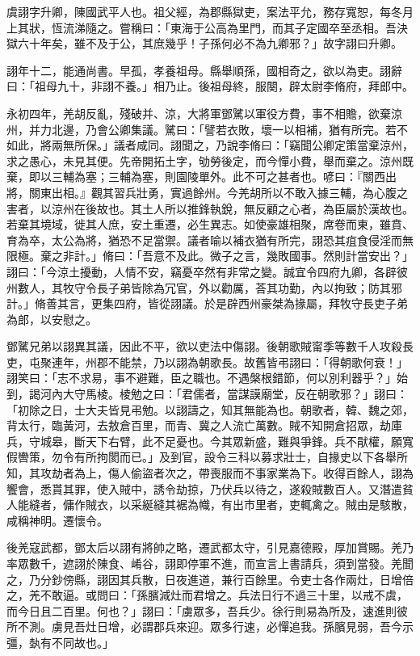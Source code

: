 
\begin{pinyinscope}
虞詡字升卿，陳國武平人也。祖父經，為郡縣獄吏，案法平允，務存寬恕，每冬月上其狀，恆流涕隨之。嘗稱曰：「東海于公高為里門，而其子定國卒至丞相。吾決獄六十年矣，雖不及于公，其庶幾乎！子孫何必不為九卿邪？」故字詡曰升卿。

詡年十二，能通尚書。早孤，孝養祖母。縣舉順孫，國相奇之，欲以為吏。詡辭曰：「祖母九十，非詡不養。」相乃止。後祖母終，服闋，辟太尉李脩府，拜郎中。

永初四年，羌胡反亂，殘破并、涼，大將軍鄧騭以軍役方費，事不相贍，欲棄涼州，并力北邊，乃會公卿集議。騭曰：「譬若衣敗，壞一以相補，猶有所完。若不如此，將兩無所保。」議者咸同。詡聞之，乃說李脩曰：「竊聞公卿定策當棄涼州，求之愚心，未見其便。先帝開拓土字，劬勞後定，而今憚小費，舉而棄之。涼州既棄，即以三輔為塞；三輔為塞，則園陵單外。此不可之甚者也。喭曰：『關西出將，關東出相。』觀其習兵壯勇，實過餘州。今羌胡所以不敢入據三輔，為心腹之害者，以涼州在後故也。其土人所以推鋒執銳，無反顧之心者，為臣屬於漢故也。若棄其境域，徙其人庶，安土重遷，必生異志。如使豪雄相聚，席卷而東，雖賁、育為卒，太公為將，猶恐不足當禦。議者喻以補衣猶有所完，詡恐其疽食侵淫而無限極。棄之非計。」脩曰：「吾意不及此。微子之言，幾敗國事。然則計當安出？」詡曰：「今涼土擾動，人情不安，竊憂卒然有非常之變。誠宜令四府九卿，各辟彼州數人，其牧守令長子弟皆除為冗官，外以勸厲，荅其功勤，內以拘致；防其邪計。」脩善其言，更集四府，皆從詡議。於是辟西州豪桀為掾屬，拜牧守長吏子弟為郎，以安慰之。

鄧騭兄弟以詡異其議，因此不平，欲以吏法中傷詡。後朝歌賊甯季等數千人攻殺長吏，屯聚連年，州郡不能禁，乃以詡為朝歌長。故舊皆弔詡曰：「得朝歌何衰！」詡笑曰：「志不求易，事不避難，臣之職也。不遇槃根錯節，何以別利器乎？」始到，謁河內大守馬棱。棱勉之曰：「君儒者，當謀謨廟堂，反在朝歌邪？」詡曰：「初除之日，士大夫皆見弔勉。以詡譸之，知其無能為也。朝歌者，韓、魏之郊，背太行，臨黃河，去敖倉百里，而青、冀之人流亡萬數。賊不知開倉招眾，劫庫兵，守城皋，斷天下右臂，此不足憂也。今其眾新盛，難與爭鋒。兵不猒權，願寬假轡策，勿令有所拘閡而已。」及到官，設令三科以募求壯士，自掾史以下各舉所知，其攻劫者為上，傷人偷盜者次之，帶喪服而不事家業為下。收得百餘人，詡為饗會，悉貰其罪，使入賊中，誘令劫掠，乃伏兵以待之，遂殺賊數百人。又潛遣貧人能縫者，傭作賊衣，以采綖縫其裾為幟，有出巿里者，吏輒禽之。賊由是駭散，咸稱神明。遷懷令。

後羌寇武都，鄧太后以詡有將帥之略，遷武都太守，引見嘉德殿，厚加賞賜。羌乃率眾數千，遮詡於陳食、崤谷，詡即停軍不進，而宣言上書請兵，須到當發。羌聞之，乃分鈔傍縣，詡因其兵散，日夜進道，兼行百餘里。令吏士各作兩灶，日增倍之，羌不敢逼。或問曰：「孫臏減灶而君增之。兵法日行不過三十里，以戒不虞，而今日且二百里。何也？」詡曰：「虜眾多，吾兵少。徐行則易為所及，速進則彼所不測。虜見吾灶日增，必謂郡兵來迎。眾多行速，必憚追我。孫臏見弱，吾今示彊，埶有不同故也。」


\end{pinyinscope}
